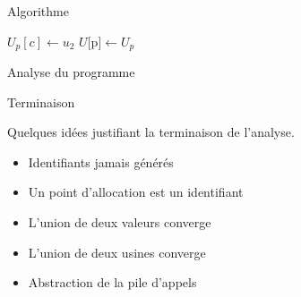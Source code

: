 \documentclass{beamer}
\begin{document}
\begin{frame}{Algorithme}
\begin{algorithm}[H]
{{{{                    $U_p[c] \gets u_2$ 
                    $U[$p$] \gets U_p$ 
        
                    \BlankLine
                     
                 }
              }{
              }
           }{
           }
        }
        \caption{Analyse du programme}
    \end{algorithm}
\end{frame}

\begin{frame}{Terminaison}
    
    Quelques idées justifiant la terminaison de l'analyse.

    \begin{itemize}
        \item Identifiants jamais générés
        \item Un point d'allocation est un identifiant
        \item L'union de deux valeurs converge
        \item L'union de deux usines converge
        \item Abstraction de la pile d'appels
    \end{itemize}
\end{frame}
\end{document}
